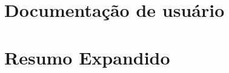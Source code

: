 \renewcommand{\thechapter}{APÊNDICE III -}
\chapter{Documentação de usuário}



\renewcommand{\thechapter}{APÊNDICE IV -}
\chapter{Resumo Expandido}

